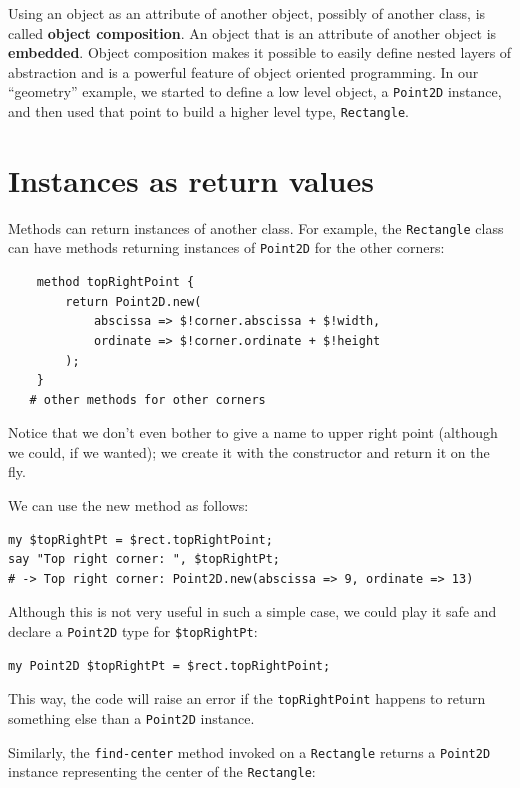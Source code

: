 Using an object as an attribute of another object, possibly 
of another class, is called {\bf object composition}. An object 
that is an attribute of another object is {\bf embedded}. Object 
composition makes it possible to easily define nested layers of 
abstraction and is a powerful feature of object oriented 
programming. In our ``geometry'' example, we started to define 
a low level object, a {\tt Point2D} instance, and then used 
that point to build a higher level type, {\tt Rectangle}.


\section{Instances as return values}

Methods can return instances of another class.  For example, 
the {\tt Rectangle} class can have methods returning 
instances of {\tt Point2D} for the other corners:

\begin{verbatim}
    method topRightPoint {
        return Point2D.new(
            abscissa => $!corner.abscissa + $!width, 
            ordinate => $!corner.ordinate + $!height
        );
    }
   # other methods for other corners
\end{verbatim}

Notice that we don't even bother to give a name to upper right 
point (although we could, if we wanted); we create it with the 
constructor and return it on the fly.

We can use the new method as follows:

\begin{verbatim}
my $topRightPt = $rect.topRightPoint;
say "Top right corner: ", $topRightPt;
# -> Top right corner: Point2D.new(abscissa => 9, ordinate => 13)
\end{verbatim}

Although this is not very useful in such a simple case, we 
could play it safe and declare a {\tt Point2D} type for 
\verb'$topRightPt':

\begin{verbatim}
my Point2D $topRightPt = $rect.topRightPoint;
\end{verbatim} 

This way, the code will raise an error if the {\tt topRightPoint} 
happens to return something else than a {\tt Point2D} instance.

Similarly, the \verb"find-center" method invoked on a 
{\tt Rectangle} returns a {\tt Point2D} instance 
representing the center of the {\tt Rectangle}:


